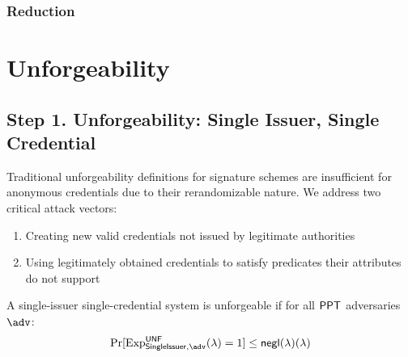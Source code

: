 \newpage
\subsubsection{Reduction}
































\newpage



























\newpage
\section{Unforgeability}

\subsection{Step 1. Unforgeability: Single Issuer, Single Credential}

Traditional unforgeability definitions for signature schemes are insufficient for anonymous credentials due to their rerandomizable nature. We address two critical attack vectors:
\begin{enumerate}
\item Creating new valid credentials not issued by legitimate authorities
\item Using legitimately obtained credentials to satisfy predicates their attributes do not support
\end{enumerate}

\begin{definition}
A single-issuer single-credential system is unforgeable if for all $\mathsf{PPT}$ adversaries $\adv$:
\[
\Pr[\mathrm{Exp}^{\mathsf{UNF}}_{\mathsf{SingleIssuer}, \adv}(\lambda) = 1] \leq \negl(\lambda)
\]
\end{definition}

